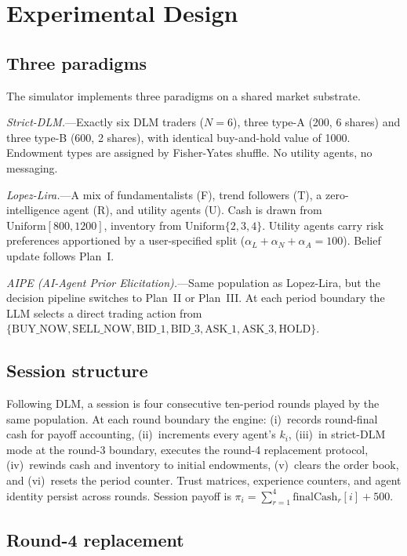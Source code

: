 \section{Experimental Design}
\label{sec:design}

\subsection{Three paradigms}

The simulator implements three paradigms on a shared market substrate.

\emph{Strict-DLM.}---Exactly six DLM traders ($N{=}6$), three type-A
(200\textcent, 6 shares) and three type-B (600\textcent, 2 shares),
with identical buy-and-hold value of 1000\textcent.  Endowment types
are assigned by Fisher-Yates shuffle.  No utility agents, no
messaging.

\emph{Lopez-Lira.}---A mix of fundamentalists (F), trend followers
(T), a zero-intelligence agent (R), and utility agents (U).  Cash is
drawn from $\text{Uniform}[800,1200]$, inventory from
$\text{Uniform}\{2,3,4\}$.  Utility agents carry risk preferences
apportioned by a user-specified split
($\alpha_L{+}\alpha_N{+}\alpha_A{=}100$).  Belief update follows
Plan~I.

\emph{AIPE (AI-Agent Prior Elicitation).}---Same population as
Lopez-Lira, but the decision pipeline switches to Plan~II or
Plan~III.  At each period boundary the LLM selects a direct trading
action from $\{\text{BUY\_NOW}, \text{SELL\_NOW}, \text{BID\_1},
\text{BID\_3}, \text{ASK\_1}, \text{ASK\_3}, \text{HOLD}\}$.

\subsection{Session structure}

Following DLM, a session is four consecutive ten-period rounds played
by the same population.  At each round boundary the engine:
(i)~records round-final cash for payoff accounting,
(ii)~increments every agent's $k_i$,
(iii)~in strict-DLM mode at the round-3 boundary, executes the
round-4 replacement protocol,
(iv)~rewinds cash and inventory to initial endowments,
(v)~clears the order book, and
(vi)~resets the period counter.
Trust matrices, experience counters, and agent identity persist
across rounds.  Session payoff is
$\pi_i = \sum_{r=1}^{4}\text{finalCash}_{r}[i] + 500$.

\subsection{Round-4 replacement}

